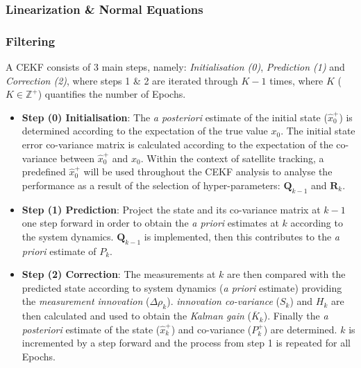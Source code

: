 \subsubsection{Linearization \& Normal Equations}

\subsubsection{Filtering}


 \noindent{}A CEKF consists of 3 main steps, namely: \textit{Initialisation (0)}, \textit{Prediction (1)} and \textit{Correction (2)}, where steps 1 \& 2 are iterated through $K-1$ times, where $K$ ($K\in\mathbb{Z}^+$) quantifies the number of Epochs.

 \begin{itemize}
     \item \textbf{Step (0) Initialisation}: The \textit{a posteriori} estimate of the initial state ($\hat{x}_0^+$) is determined according to the expectation of the true value $x_0$. The initial state error co-variance matrix is calculated according to the expectation of the co-variance between $\hat{x}_0^+$ and $x_0$. Within the context of satellite tracking, a predefined $\hat{x}_0^+$ will be used throughout the CEKF analysis to analyse the performance as a result of the selection of hyper-parameters: $\bm{Q}_{k-1}$ and $\bm{R}_k$.
     \item \textbf{Step (1) Prediction}: Project the state and its co-variance matrix at $k-1$ one step forward in order to obtain the \textit{a priori} estimates at $k$ according to the system dynamics. $\bm{Q}_{k-1}$ is implemented, then this contributes to the \textit{a priori} estimate of $P_k^{}$.
    \item \textbf{Step (2) Correction}: The measurements at $k$ are then compared with the predicted state according to system dynamics (\textit{a priori} estimate) providing the \textit{measurement innovation} ($\Delta{\rho}_k$). \textit{innovation co-variance} ($S_k$) and $H_k$ are then calculated and used to obtain the \textit{Kalman gain} ($\overline{K}_k$). Finally the \textit{a posteriori} estimate of the state ($\hat{x}_k^+$) and co-variance ($P_k^+$) are determined. $k$ is incremented by a step forward and the process from step 1 is repeated for all Epochs.
 \end{itemize}

